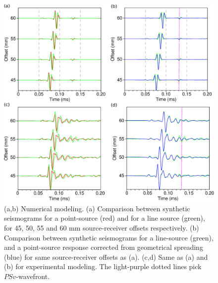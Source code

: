 \documentclass[manuscript,revised]{geophysics}
\begin{document}
\begin{figure}[!h]
	\centering
	\includegraphics[scale=0.5]{fig/trans2d3d.eps}
	\caption{(a,b) Numerical modeling. (a) Comparison between synthetic seismograms for a point-source (red) and for a line source (green), for 45, 50, 55 and 60 mm source-receiver offsets respectively. (b) Comparison between synthetic seismograms for a line-source (green), and a point-source response corrected from geometrical spreading (blue) for same source-receiver offsets as (a). (c,d) Same as (a) and (b) for experimental modeling. The light-purple dotted lines pick $PSv$-wavefront.}%
	\label{panel_amplitude_sem}
\end{figure}

\end{document}
